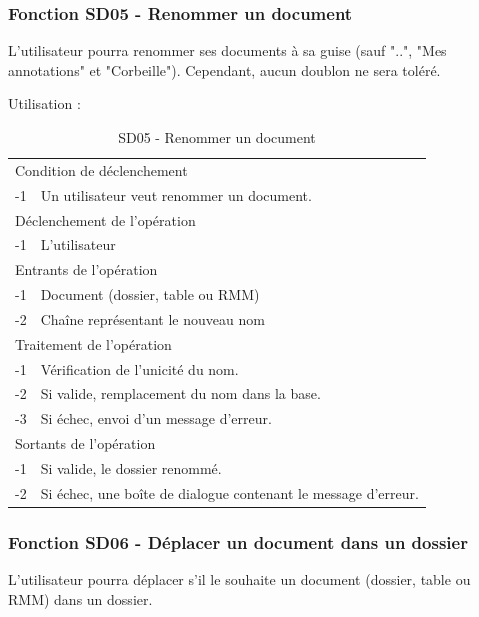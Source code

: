 \documentclass[a4paper]{article}
\begin{document}
\subsubsection{Fonction SD05 - Renommer un document}
L'utilisateur pourra renommer ses documents à sa guise (sauf "..", "Mes annotations" et "Corbeille"). Cependant, aucun doublon ne sera toléré.

Utilisation : 

\begin{table}[H]
  \centering
   \small
	\begin{tabular}{|c|p{12cm}|}
   		\hline
   			\rowcolor{lightgray}\multicolumn{2}{|c|}{\textbf{SD05 - Renommer un document}} \\
   		\hline
   			\multicolumn{2}{|l|}{Condition de d\'eclenchement} \\
   		\hline
   			-1 & Un utilisateur veut renommer un document.\\
   		\hline
   			\multicolumn{2}{|l|}{D\'eclenchement de l'op\'eration} \\
   		\hline
   			-1 & L'utilisateur  \\
   		\hline
   			\multicolumn{2}{|l|}{Entrants de l'op\'eration} \\
   		\hline
   			-1 & Document (dossier, table ou RMM)\\
        		-2 & Chaîne représentant le nouveau nom\\
   		\hline
   			\multicolumn{2}{|l|}{Traitement de l'op\'eration} \\
  		\hline
   			-1 & Vérification de l'unicité du nom. \\
			-2 & Si valide, remplacement du nom dans la base. \\
			-3 & Si échec, envoi d'un message d'erreur. \\
   		\hline
   			\multicolumn{2}{|l|}{Sortants de l'op\'eration} \\
   		\hline
   			-1 & Si valide, le dossier renommé. \\
			-2 & Si échec, une boîte de dialogue contenant le message d'erreur. \\
   		\hline
	\end{tabular}
  \caption{SD05 - Renommer un document}
  \normalsize
  \label{tab:renommer_document}
\end{table}

\subsubsection{Fonction SD06 - Déplacer un document dans un dossier}
L'utilisateur pourra déplacer s'il le souhaite un document (dossier, table ou RMM) dans un dossier.
\end{document}
